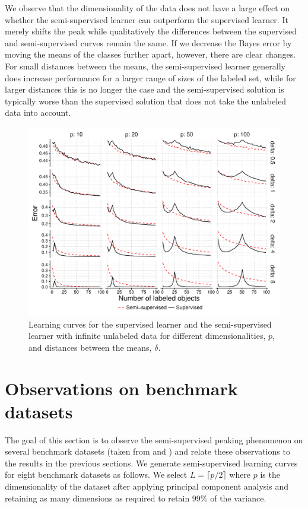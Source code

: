 \documentclass[runningheads,a4paper]{llncs}\usepackage[]{graphicx}\usepackage[]{color}
\makeatletter
\def\maxwidth{ %
  \ifdim\Gin@nat@width>\linewidth
    \linewidth
  \else
    \Gin@nat@width
  \fi
}
\newenvironment{knitrout}{}{} %
\makeatother
\begin{document}
We observe that the dimensionality of the data does not have a large effect on whether the semi-supervised learner can outperform the supervised learner. It merely shifts the peak while qualitatively the differences between the supervised and semi-supervised curves remain the same. If we decrease the Bayes error by moving the means of the classes further apart, however, there are clear changes. For small distances between the means, the semi-supervised learner generally does increase performance for a larger range of sizes of the labeled set, while for larger distances this is no longer the case and the semi-supervised solution is typically worse than the supervised solution that does not take the unlabeled data into account.

\begin{knitrout}
\color{fgcolor}\begin{figure}
\includegraphics[width=\maxwidth]{figure/infinitedata-1} \caption[Learning curves for the supervised learner and the semi-supervised learner with infinite unlabeled data for different dimensionalities, ]{Learning curves for the supervised learner and the semi-supervised learner with infinite unlabeled data for different dimensionalities, $p$, and distances between the means, $\delta$.}\label{fig:infinitedata}
\end{figure}


\end{knitrout}

\section{Observations on benchmark datasets}
The goal of this section is to observe the semi-supervised peaking phenomenon on several benchmark datasets (taken from \cite{Chapelle2006} and \cite{Lichman2013}) and relate these observations to the results in the previous sections. We generate semi-supervised learning curves for eight benchmark datasets as follows. We select $L=\lceil p/2 \rceil$ where $p$ is the dimensionality of the dataset after applying principal component analysis and retaining as many dimensions as required to retain $99\%$ of the variance. 
\end{document}

